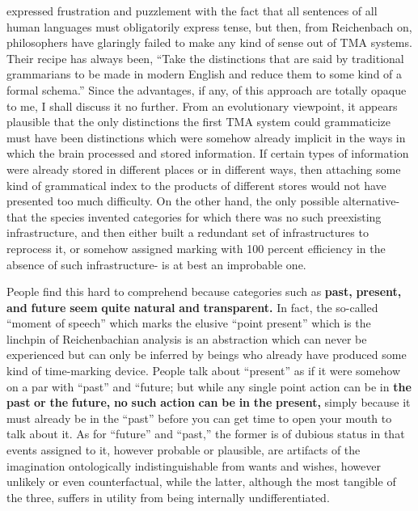 \citet[170]{Quine1960} expressed frustration and puzzlement with the fact that all sentences of all human languages must obligatorily express tense, but then, from Reichenbach on, philosophers have glaringly failed to make any kind of sense out of TMA systems. Their recipe has always been, ``Take the distinctions that are said by tradi\-tional grammarians to be made in modern English and reduce them to some kind of a formal schema.'' Since the advantages, if any, of this
approach are totally opaque to me, I shall discuss it no further. From
an evolutionary viewpoint, it appears plausible that the only distinc\-tions the first TMA system could grammaticize must have been dis\-tinctions which were somehow already implicit in the ways in which the brain processed and stored information. If certain types of infor\-mation were already stored in different places or in different ways, then attaching some kind of grammatical index to the products of different stores would not have presented too much difficulty. On the other hand, the only possible alternative- that the species invented cate\-gories for which there was no such preexisting infrastructure, and then either built a redundant set of infrastructures to reprocess it, or some\-how assigned marking with 100 percent efficiency in the absence of such infrastructure- is at best an improbable one.

People find this hard to comprehend because categories such as \textbf{{\textquotedbl}past,{\textquotedbl}} \textbf{{\textquotedbl}present,{\textquotedbl}} \textbf{and} \textbf{{\textquotedbl}future{\textquotedbl}} \textbf{seem} \textbf{quite} \textbf{natural} \textbf{and} \textbf{transparent.} In fact, the so-called ``moment of speech'' which marks the elusive ``point present'' which is the linchpin of Reichenbachian analysis is an abstraction which can never be experienced but can only be inferred by beings who already have produced some kind of time-marking device. People talk about ``present'' as if it were somehow on a par with ``past'' and ``future{\textquotedbl}; but while any single point action can be in \textbf{the} \textbf{{\textquotedbl}past{\textquotedbl}} \textbf{or} \textbf{the} \textbf{{\textquotedbl}future,{\textquotedbl}} \textbf{no} \textbf{such} \textbf{action} \textbf{can} \textbf{be} \textbf{in} \textbf{the} \textbf{{\textquotedbl}present,{\textquotedbl}} simply because it must already be in the ``past'' before you can get time to open your mouth to talk about it. As for ``future'' and ``past,'' the former is of dubious status in that events assigned to it, however probable or plausible, are artifacts of the imagination ontologically indistinguishable from wants and wishes, however unlikely or even counterfactual, while the latter, although the most tangible of the three, suffers in utility from being internally undifferentiated.

